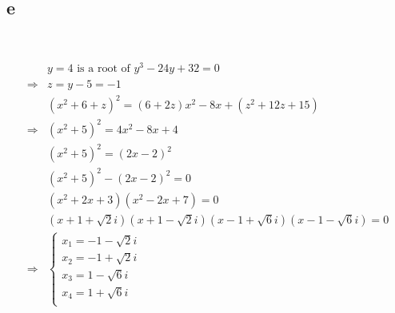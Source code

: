 \documentclass{article}
\begin{document}
~

\subsection*{e}

~

\begin{align*}
    &y=4\text{ is a root of }y^3-24y+32=0\\
    \Rightarrow&z=y-5=-1\\
    &(x^2+6+z)^2=(6+2z)x^2-8x+(z^2+12z+15)\\
    \Rightarrow&(x^2+5)^2=4x^2-8x+4\\
    &(x^2+5)^2=(2x-2)^2\\
    &(x^2+5)^2-(2x-2)^2=0\\
    &(x^2+2x+3)(x^2-2x+7)=0\\
    &(x+1+\sqrt{2}i)(x+1-\sqrt{2}i)(x-1+\sqrt{6}i)(x-1-\sqrt{6}i)=0\\
    \Rightarrow&\begin{cases}
        x_1=-1-\sqrt{2}i\\
        x_2=-1+\sqrt{2}i\\
        x_3=1-\sqrt{6}i\\
        x_4=1+\sqrt{6}i\\
    \end{cases}
\end{align*}
\end{document}

